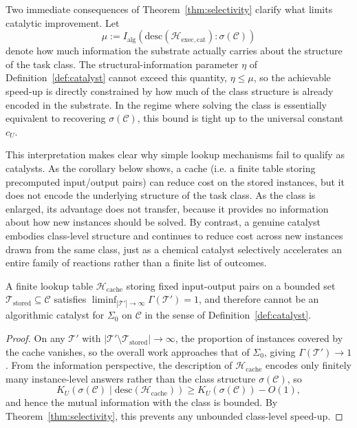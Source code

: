 \documentclass[runningheads]{llncs}
\newcommand{\Sys}{\Sigma}
\newcommand{\Hw}{\mathcal{H}}
\newcommand{\Task}{\mathcal{T}}
\newcommand{\Class}{\mathcal{C}}
\newcommand{\descop}{\mathrm{desc}}
\newcommand{\MutInfo}{I_{\mathrm{alg}}}
\begin{document}
Two immediate consequences of Theorem~\ref{thm:selectivity} clarify
what limits catalytic improvement. Let
\[
\mu :=
\MutInfo(\descop(\Hw_{\mathrm{exec,cat}}):\sigma(\Class))
\]
denote how much information the substrate actually carries about
the structure of the task class. The structural-information
parameter $\eta$ of Definition~\ref{def:catalyst} cannot exceed
this quantity, $\eta \le \mu$, so the achievable speed-up is
directly constrained by how much of the class structure is already
encoded in the substrate. In the regime where solving the class is
essentially equivalent to recovering $\sigma(\Class)$, this bound is
tight up to the universal constant $c_U$.

This interpretation makes clear why simple lookup mechanisms fail
to qualify as catalysts. As the corollary below shows, a cache (i.e. a finite table storing
precomputed input/output pairs) can reduce cost on the stored
instances, but it does not encode the underlying structure of the
task class. As the class is enlarged, its advantage does not
transfer, because it provides no information about how new
instances should be solved. By contrast, a genuine catalyst
embodies class-level structure and continues to reduce cost across
new instances drawn from the same class, just as a chemical
catalyst selectively accelerates an entire family of reactions
rather than a finite list of outcomes. 

\begin{corollary}
\label{cor:cache}
A finite lookup table $\Hw_{\mathrm{cache}}$ storing fixed
input-output pairs on a bounded set
$\Task_{\mathrm{stored}}\subseteq\Class$ satisfies
$\liminf_{|\Task'|\to\infty}\Gamma(\Task')=1$, and therefore cannot
be an algorithmic catalyst for $\Sys_0$ on $\Class$ in the sense of
Definition~\ref{def:catalyst}.
\end{corollary}
\begin{proof}
On any $\Task'$ with $|\Task'\setminus\Task_{\mathrm{stored}}|
\to\infty$, the proportion of instances covered by the cache
vanishes, so the overall work approaches that of $\Sys_0$, giving
$\Gamma(\Task')\to 1$. From the information perspective, the
description of $\Hw_{\mathrm{cache}}$ encodes only finitely many
instance-level answers rather than the class structure
$\sigma(\Class)$, so
\[
K_U(\sigma(\Class)\mid\descop(\Hw_{\mathrm{cache}}))
\ge
K_U(\sigma(\Class)) - O(1),
\]
and hence the mutual information with the class is bounded. By
Theorem~\ref{thm:selectivity}, this prevents any unbounded
class-level speed-up.
\end{proof}
\end{document}
